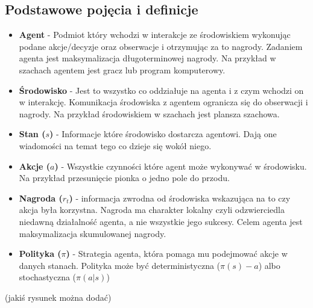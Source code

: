 \documentclass[a4paper, 12pt]{article}
\begin{document}
    \subsection{Podstawowe pojęcia i definicje}
    \begin{itemize}
        \item \textbf{Agent} - Podmiot który wchodzi w interakcje ze środowiskiem wykonując podane akcje/decyzje oraz obserwacje i otrzymując za to nagrody.
        Zadaniem agenta jest maksymalizacja długoterminowej nagrody. Na przykład w szachach agentem jest gracz lub program komputerowy.
        \item \textbf{Środowisko} - Jest to wszystko co oddziałuje na agenta i z czym wchodzi on w interakcję. Komunikacja środowiska
        z agentem ogranicza się do obserwacji i nagrody. Na przykład środowiskiem w szachach jest plansza szachowa.
        \item \textbf{Stan (\( s \))} - Informacje które środowisko dostarcza agentowi. Dają one wiadomości na temat tego co dzieje się wokół niego.
        \item \textbf{Akcje (\( a \))} - Wszystkie czynności które agent może wykonywać w środowisku. Na przykład przesunięcie
        pionka o jedno pole do przodu.
        \item \textbf{Nagroda (\( r_t \))} - informacja zwrodna od środowiska wskazująca na to czy akcja była korzystna.
        Nagroda ma charakter lokalny czyli odzwierciedla niedawną działalność agenta, a nie wszystkie jego sukcesy. Celem agenta jest maksymalizacja
        skumulowanej nagrody.
        \item \textbf{Polityka (\( \pi \))} - Strategia agenta, która pomaga mu podejmować akcje w danych stanach. Polityka może być deterministyczna
        (\( \pi(s) - a \)) albo stochastyczna (\( \pi(a|s) \))
    \end{itemize}
    (jakiś rysunek można dodać)
\end{document}
